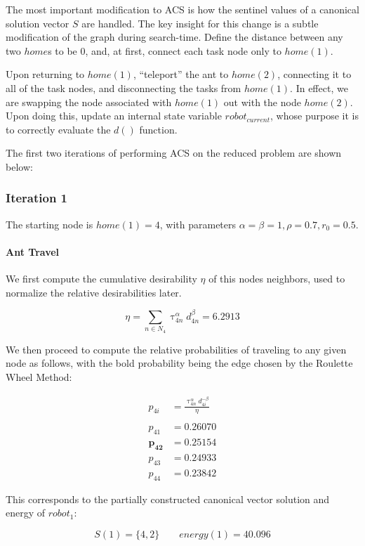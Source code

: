 \documentclass[a4paper]{article}
\newcommand{\subsubsubsection}[1]{\paragraph{#1} \mbox{}}
\begin{document}
The most important modification to ACS is how the sentinel values of a canonical solution vector $S$ are handled.
The key insight for this change is a subtle modification of the graph during search-time. Define the distance between any
two $home$s to be 0, and, at first, connect each task node only to $home(1)$.

Upon returning to $\mathit{home}(1)$, ``teleport'' the ant to $\mathit{home}(2)$, connecting it to all
of the task nodes, and disconnecting the tasks from $\mathit{home}(1)$. In effect, we are swapping the node associated with $\mathit{home}(1)$ out with the node $\mathit{home}(2)$. Upon doing this, update an
internal state variable $robot_{current}$, whose purpose it is to correctly
evaluate the $d()$ function.

The first two iterations of performing ACS on the reduced problem are shown below:

\subsubsection{Iteration 1}

The starting node is $\mathit{home}(1) = 4$, with parameters $\alpha = \beta = 1, \rho = 0.7, r_0 = 0.5$.

\subsubsubsection{Ant Travel}

We first compute the cumulative desirability $\eta$ of this nodes neighbors, used to normalize the relative desirabilities later.

$$
\eta = \sum_{n \in N_4} \uptau_{4n}^\alpha d_{4n}^\beta = 6.2913
$$

We then proceed to compute the relative probabilities of traveling to any given node as follows, with the bold probability being the edge chosen by the Roulette Wheel Method:

\begin{align*}
p_{4i} &= \frac{\uptau_{4n}^\alpha d_{4i}^{-\beta}}{\eta} \\
\\
p_{41} &= 0.26070 \\
\mathbf{p_{42}} &= \mathbf{0.25154} \\
p_{43} &= 0.24933 \\
p_{44} &= 0.23842
\end{align*}

This corresponds to the partially constructed canonical vector solution and energy of $robot_1$:

$$
S(1) = \{4, 2\} \qquad \mathit{energy}(1) = 40.096
$$
\end{document}
